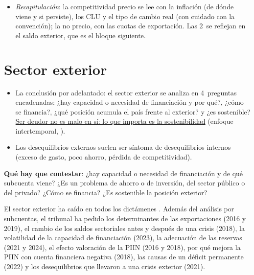 \documentclass[11pt]{article}
\begin{document}
\begin{itemize}
\item \emph{Recapitulación}: la competitividad precio se lee con la inflación (de dónde viene y si persiste), los CLU y el tipo de cambio real (con cuidado con la convención); la no precio, con las cuotas de exportación. Las 2~se reflejan en el saldo exterior, que es el bloque siguiente.
\end{itemize}


\section{Sector exterior}\label{sec:exterior}

\begin{itemize}
\item La conclusión por adelantado: el sector exterior se analiza en 4~preguntas encadenadas: ¿hay capacidad o necesidad de financiación y por qué?, ¿cómo se financia?, ¿qué posición acumula el país frente al exterior? y ¿es sostenible? \uline{Ser deudor no es malo en sí: lo que importa es la sostenibilidad} (enfoque intertemporal, ).
\item Los desequilibrios externos suelen ser síntoma de desequilibrios internos (exceso de gasto, poco ahorro, pérdida de competitividad).
\end{itemize}

\begin{ideaclave}
\textbf{Qué hay que contestar}: ¿hay capacidad o necesidad de financiación y de qué subcuenta viene? ¿Es un problema de ahorro o de inversión, del sector público o del privado? ¿Cómo se financia? ¿Es sostenible la posición exterior?
\end{ideaclave}

\begin{notaopositor}
El sector exterior ha caído en todos los dictámenes \parencite{ATCEE2026Examenes}. Además del análisis por subcuentas, el tribunal ha pedido los determinantes de las exportaciones (2016 y 2019), el cambio de los saldos sectoriales antes y después de una crisis (2018), la volatilidad de la capacidad de financiación (2023), la adecuación de las reservas (2021 y 2024), el efecto valoración de la PIIN (2016 y 2018), por qué mejora la PIIN con cuenta financiera negativa (2018), las causas de un déficit permanente (2022) y los desequilibrios que llevaron a una crisis exterior (2021).
\end{notaopositor}
\end{document}
